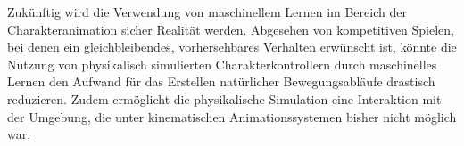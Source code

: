 Zukünftig wird die Verwendung von maschinellem Lernen im Bereich der Charakteranimation sicher Realität werden. Abgesehen von kompetitiven Spielen, bei denen ein gleichbleibendes, vorhersehbares Verhalten erwünscht ist, könnte die Nutzung von physikalisch simulierten Charakterkontrollern durch maschinelles Lernen den Aufwand für das Erstellen natürlicher Bewegungsabläufe drastisch reduzieren. Zudem ermöglicht die physikalische Simulation eine Interaktion mit der Umgebung, die unter kinematischen Animationssystemen bisher nicht möglich war.